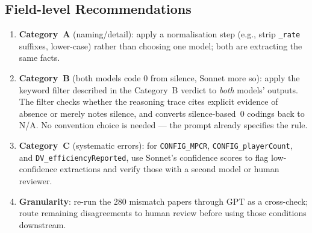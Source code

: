 \documentclass[11pt,a4paper]{article}
\begin{document}
        \subsection{Field-level Recommendations}
        \begin{enumerate}
          \item \textbf{Category~A} (naming/detail): apply a normalisation step
            (e.g., strip \texttt{\_rate} suffixes, lower-case) rather than choosing
            one model; both are extracting the same facts.
          \item \textbf{Category~B} (both models code 0 from silence, Sonnet more so):
            apply the keyword filter described in the Category~B verdict to
            \emph{both} models' outputs.  The filter checks whether the reasoning
            trace cites explicit evidence of absence or merely notes silence, and
            converts silence-based~0 codings back to N/A.  No convention choice is
            needed --- the prompt already specifies the rule.
          \item \textbf{Category~C} (systematic errors): for \texttt{CONFIG\_MPCR},
            \texttt{CONFIG\_playerCount}, and \texttt{DV\_efficiencyReported},
            use Sonnet's confidence scores to flag low-confidence extractions and
            verify those with a second model or human reviewer.
          \item \textbf{Granularity}: re-run the 280 mismatch papers
            through GPT as a cross-check; route remaining disagreements to human
            review before using those conditions downstream.
        \end{enumerate}
\end{document}
